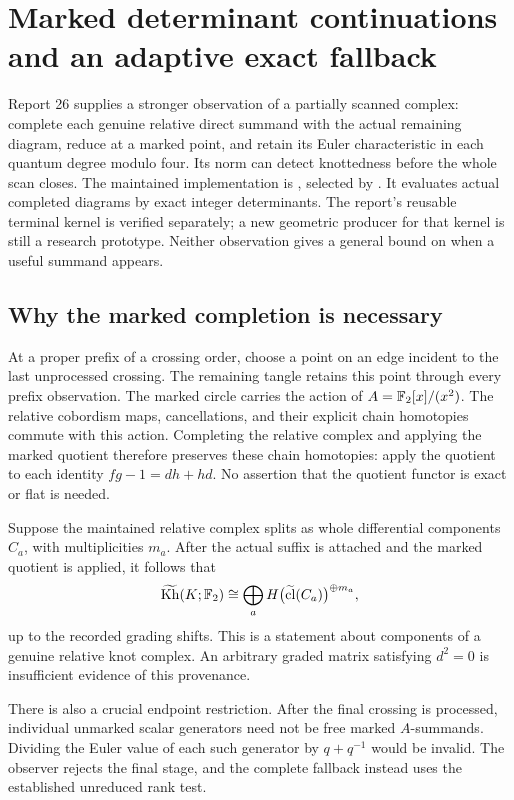\section{Marked determinant continuations and an adaptive exact fallback}
\label{sec:determinant-continuations}

Report 26 supplies a stronger observation of a partially scanned complex:
complete each genuine relative direct summand with the actual remaining
diagram, reduce at a marked point, and retain its Euler characteristic in
each quantum degree modulo four.  Its norm can detect knottedness before
the whole scan closes.  The maintained implementation is
, selected by .
It evaluates actual completed diagrams by exact integer determinants.
The report's reusable terminal kernel is verified separately; a new
geometric producer for that kernel is still a research prototype.
Neither observation gives a general bound on when a useful summand appears.

\subsection{Why the marked completion is necessary}

At a proper prefix of a crossing order, choose a point on an edge incident
to the last unprocessed crossing.  The remaining tangle retains this point
through every prefix observation.  The marked circle carries the action
of $A=\mathbb{F}_2[x]/(x^2)$.  The relative cobordism maps, cancellations, and their
explicit chain homotopies commute with this action.  Completing the relative
complex and applying the marked quotient therefore preserves these chain
homotopies: apply the quotient to each identity $fg-1=dh+hd$.
No assertion that the quotient functor is exact or flat is needed.

Suppose the maintained relative complex splits as whole differential
components $C_a$, with multiplicities $m_a$.  After the actual suffix is
attached and the marked quotient is applied, it follows that
\[
 \widetilde{\mathrm{Kh}}(K;\mathbb{F}_2)\cong\bigoplus_a
 H\bigl(\widetilde{\operatorname{cl}}(C_a)\bigr)^{\oplus m_a},
\]
up to the recorded grading shifts.  This is a statement about components
of a genuine relative knot complex.  An arbitrary graded matrix satisfying
$d^2=0$ is insufficient evidence of this provenance.

There is also a crucial endpoint restriction.  After the final crossing
is processed, individual unmarked scalar generators need not be free
marked $A$-summands.  Dividing the Euler value of each such generator by
$q+q^{-1}$ would be invalid.  The observer rejects the final stage, and
the complete fallback instead uses the established unreduced rank test.


